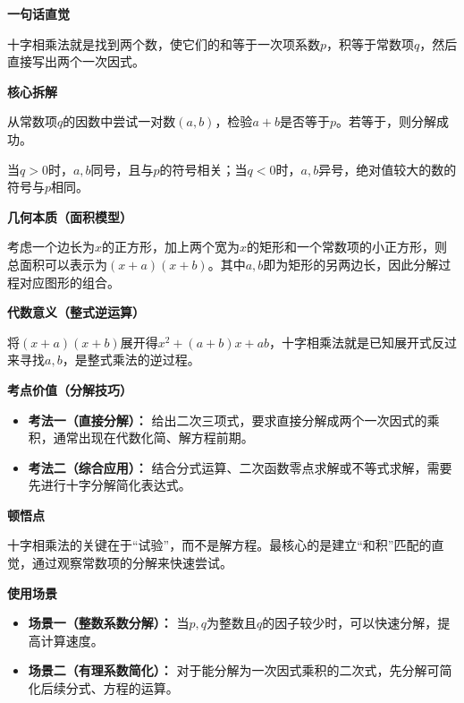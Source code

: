 \begin{explanationbox}
	\textbf{\textcolor{CExplanation}{一句话直觉}}

	十字相乘法就是找到两个数，使它们的和等于一次项系数$p$，积等于常数项$q$，然后直接写出两个一次因式。

	\medskip
	\textbf{\textcolor{CExplanation}{核心拆解}}
	\begin{description}[style=nextline, leftmargin=2.8em, labelsep=0.5em, itemsep=0.45em]
		\item[\textbf{要点一（试根策略）：}] 从常数项$q$的因数中尝试一对数$(a,b)$，检验$a+b$是否等于$p$。若等于，则分解成功。
		\item[\textbf{要点二（符号规则）：}] 当$q>0$时，$a,b$同号，且与$p$的符号相关；当$q<0$时，$a,b$异号，绝对值较大的数的符号与$p$相同。
	\end{description}

	\medskip
	\textbf{\textcolor{CExplanation}{几何本质（面积模型）}}

	考虑一个边长为$x$的正方形，加上两个宽为$x$的矩形和一个常数项的小正方形，则总面积可以表示为$(x+a)(x+b)$。其中$a,b$即为矩形的另两边长，因此分解过程对应图形的组合。

	\medskip
	\textbf{\textcolor{CExplanation}{代数意义（整式逆运算）}}

	将$(x+a)(x+b)$展开得$x^2+(a+b)x+ab$，十字相乘法就是已知展开式反过来寻找$a,b$，是整式乘法的逆过程。

	\medskip
	\textbf{\textcolor{CExplanation}{考点价值（分解技巧）}}
	\begin{itemize}[leftmargin=*, itemsep=0.5em, topsep=0.4em]
		\item \textbf{考法一（直接分解）：} 给出二次三项式，要求直接分解成两个一次因式的乘积，通常出现在代数化简、解方程前期。
		\item \textbf{考法二（综合应用）：} 结合分式运算、二次函数零点求解或不等式求解，需要先进行十字分解简化表达式。
	\end{itemize}

	\medskip
	\textbf{\textcolor{CExplanation}{顿悟点}}

	十字相乘法的关键在于“试验”，而不是解方程。最核心的是建立“和积”匹配的直觉，通过观察常数项的分解来快速尝试。

	\medskip
	\textbf{\textcolor{CExplanation}{使用场景}}
	\begin{itemize}[leftmargin=*, itemsep=0.5em, topsep=0.4em]
		\item \textbf{场景一（整数系数分解）：} 当$p,q$为整数且$q$的因子较少时，可以快速分解，提高计算速度。
		\item \textbf{场景二（有理系数简化）：} 对于能分解为一次因式乘积的二次式，先分解可简化后续分式、方程的运算。
	\end{itemize}
\end{explanationbox}
